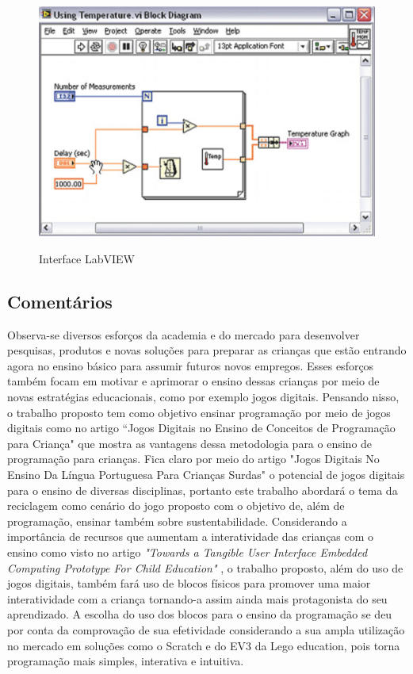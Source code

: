 \begin{figure}[H]
    \caption{Interface LabVIEW}
    \centering
        \includegraphics[width=\linewidth]{Imagens/cap2/labview.png}
    \label{figura:labview}
\end{figure}

\subsection{Comentários}
Observa-se diversos esforços da academia e do mercado para desenvolver pesquisas, produtos e novas soluções para preparar as crianças que estão entrando agora no ensino básico para assumir futuros novos empregos. Esses esforços também focam em motivar e aprimorar o ensino dessas crianças por meio de novas estratégias educacionais, como  por exemplo jogos digitais. Pensando nisso, o trabalho proposto tem como objetivo ensinar programação por meio de jogos digitais como no artigo “Jogos Digitais no Ensino de Conceitos de Programação para Criança" \cite{tadesco_2016} que mostra as vantagens dessa metodologia para o ensino de programação para crianças. Fica claro por meio do artigo "Jogos Digitais No Ensino Da Língua Portuguesa Para Crianças Surdas" \cite{liz_2017} o potencial de jogos digitais para o ensino de diversas disciplinas, portanto este trabalho abordará o tema da reciclagem como cenário do jogo proposto com o objetivo de, além de programação, ensinar também sobre sustentabilidade. Considerando a importância de recursos que aumentam a interatividade das crianças com o ensino como visto no artigo \textit{"Towards a Tangible User Interface Embedded Computing Prototype For Child Education"} \cite{carneiro_2018}, o trabalho proposto, além do uso de jogos digitais, também fará uso de blocos físicos para promover uma maior interatividade com a criança tornando-a assim ainda mais protagonista do seu aprendizado. A escolha do uso dos blocos para o ensino da programação se deu por conta da comprovação de sua efetividade considerando a sua ampla utilização no mercado em soluções como o Scratch e do EV3 da Lego education, pois torna programação mais simples, interativa e intuitiva. 





